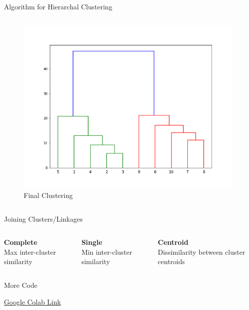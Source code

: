 \documentclass{beamer}
\begin{document}
\begin{frame}{Algorithm for Hierarchal Clustering}
\begin{columns}[T]
\begin{column}{0.5\textwidth}
\begin{figure}
\begin{overprint}
       \includegraphics[width=1.1\textwidth]{unsupervised/h_e_2.png}
      \vspace*{-0.6cm}
      \caption{Final Clustering}
    \end{overprint}
    \end{figure}
  \end{column}
\end{columns}
\end{frame}

\begin{frame}{Joining Clusters/Linkages}
\begin{columns}[T]
  \begin{column}{0.33\textwidth}
  \textbf{Complete}\\
  Max inter-cluster similarity
  \end{column}
  \begin{column}{0.33\textwidth}
  \textbf{Single} \\
  Min inter-cluster similarity
  \end{column}
  \begin{column}{0.33\textwidth}
  \textbf{Centroid} \\
  Dissimilarity between cluster centroids 
  \end{column}
\end{columns}

\end{frame}

\begin{frame}{More Code}
\begin{center}
\href{https://colab.research.google.com/drive/1HMPn0mpMAe4XFe5Zvh4oExgi5evkgjTi}{Google Colab Link}
\end{center}
\end{frame}
\end{document}
